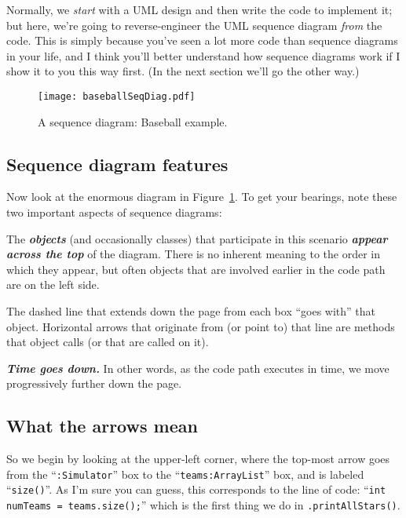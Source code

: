 Normally, we \textit{start} with a UML design and then write the code to
implement it; but here, we're going to reverse-engineer the UML sequence
diagram \textit{from} the code. This is simply because you've seen a lot more
code than sequence diagrams in your life, and I think you'll better understand
how sequence diagrams work if I show it to you this way first. (In the next
section we'll go the other way.)

\begin{figure}
\centering
\texttt{[image: baseballSeqDiag.pdf]} %
\vspace{.1in}
\caption{A sequence diagram: Baseball example.}
\label{fig:baseballSeqDiag}
\end{figure}

\subsection{Sequence diagram features}

Now look at the enormous diagram in Figure~\ref{fig:baseballSeqDiag}. To get
your bearings, note these two important aspects of sequence diagrams:

\begin{compactitem}
\item The \textbf{\textit{objects}} (and occasionally classes) that
participate in this scenario \textbf{\textit{appear across the top}} of the
diagram. There is no inherent meaning to the order in which they appear, but
often objects that are involved earlier in the code path are on the left side.
\item The dashed line that extends down the page from each box ``goes with''
that object. Horizontal arrows that originate from (or point to) that line are
methods that object calls (or that are called on it).
\item \textit{\textbf{Time goes down.}} In other words, as the code path
executes in time, we move progressively further down the page.
\end{compactitem}

\subsection{What the arrows mean}

So we begin by looking at the upper-left corner, where the top-most arrow goes
from the ``\texttt{:Simulator}'' box to the ``\texttt{teams:ArrayList}'' box,
and is labeled ``\texttt{size()}''. As I'm sure you can guess, this corresponds
to the line of code: ``\texttt{int numTeams = teams.size();}'' which is the
first thing we do in \texttt{.printAllStars()}.

